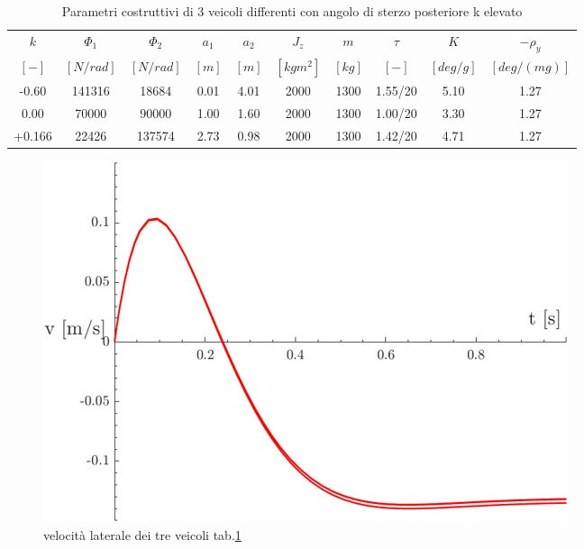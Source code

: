 \begin{table}[htbp]
  \centering
  \footnotesize
  \begin{tabular}{@{}|c|c|c|c|c|c|c|c|c|c|@{}}
    \hline
    $k$   & $\Phi_1$    & $\Phi_2$    & $a_1$   & $a_2$   & $J_z$   & $m$    & $\tau$    & $K$    & $-\rho_y$ \\
    $[-]$ & $[N/rad]$ & $[N/rad]$ & $[m]$ & $[m]$ & $[kg m^2]$ & $[kg]$ & $[-]$ & $[deg/g]$ & $[deg/(mg)]$ \\
    \hline
    -0.60 & 141316 & 18684 & 0.01 & 4.01 & 2000 & 1300 & 1.55/20 & 5.10 & 1.27 \\
    \hline
    0.00  & 70000 & 90000 & 1.00 & 1.60 & 2000 & 1300 & 1.00/20 & 3.30 & 1.27 \\
    \hline
     +0.166& 22426  & 137574& 2.73 & 0.98 & 2000 & 1300 & 1.42/20 & 4.71 & 1.27 \\
    \hline
  \end{tabular}
  \caption{Parametri costruttivi di 3 veicoli differenti con angolo di sterzo posteriore k elevato}
  \label{tab:table 7.2}
\end{table}

\begin{figure}[!h]
    \centering
    \includegraphics[scale=0.6]{Immagini/Understeer Gradient/table7.2.jpg}
    \caption{velocità laterale dei tre veicoli tab.\ref{tab:table 7.2}}
    \label{fig:table7.2 v}
\end{figure}

